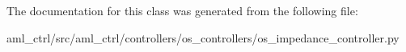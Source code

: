 The documentation for this class was generated from the following file\-:\begin{DoxyCompactItemize}
\item 
aml\-\_\-ctrl/src/aml\-\_\-ctrl/controllers/os\-\_\-controllers/os\-\_\-impedance\-\_\-controller.\-py\end{DoxyCompactItemize}
